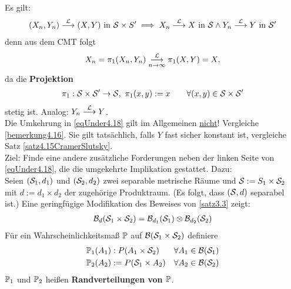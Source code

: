 Es gilt:
\begin{align}\label{eqUnder4.18}
(X_n,Y_n)\stackrel{\L}{\longrightarrow}(X,Y)\text { in }\S\times S'
\implies X_n\stackrel{\L}{\longrightarrow} X\text{ in }\S\wedge
Y_n\stackrel{\L}{\longrightarrow} Y\text{ in }\S'
\end{align}
denn aus dem CMT folgt
\begin{align*}
X_n=\pi_1(X_n,Y_n)\stackrelnew{n\to\infty}{\L}{\longrightarrow}\pi_1(X,Y)=X,
\end{align*}
da die \textbf{Projektion}
\begin{align*}
\pi_1:\S\times\S'\to\S,~\pi_1(x,y):=x\qquad\forall (x,y)\in\S\times\S'
\end{align*}
stetig ist. Analog: $Y_n\stackrel{\L}{\longrightarrow} Y$.\\
Die Umkehrung in \eqref{eqUnder4.18} gilt im Allgemeinen \underline{nicht}! Vergleiche \ref{bemerkung4.16}. Sie gilt tatsächlich, falls $Y$ fast sicher konstant ist, vergleiche Satz \ref{satz4.15CramerSlutsky}.\\
Ziel: Finde eine andere zusätzliche Forderungen neben der linken Seite von \eqref{eqUnder4.18}, die die umgekehrte Implikation gestattet. Dazu:\\
Seien $(\S_1,d_1)$ und $(\S_2,d_2)$ zwei separable metrische Räume und $\S:=S_1\times\S_2$ mit $d:=d_1\times d_2$ der zugehörige Produktraum. (Es folgt, dass $(\S,d)$ separabel ist.) Eine geringfügige Modifikation  des Beweises von \ref{satz3.3} zeigt:
\begin{align*}
\B_d(\S_1\times\S_2)=\B_{d_1}(\S_1)\otimes\B_{d_2}(\S_2)
\end{align*}
Für ein Wahrscheinlichkeitsmaß $\P$ auf $\B(\S_1\times\S_2)$ definiere 
\begin{align*}
\P_1(A_1)&:P(A_1\times\S_2) &\forall A_1\in\B(\S_1)\\
\P_2(A_2)&:=P(\S_1\times A_2) &\forall A_2\in\B(\S_2)
\end{align*}
$\P_1$ und $\P_2$ heißen \textbf{Randverteilungen von $\P$}.

